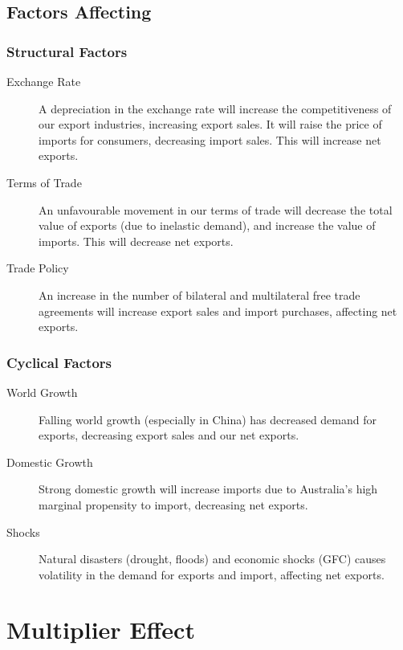 \documentclass[a4paper,11pt]{article}
\begin{document}
\subsection{Factors Affecting}

\subsubsection{Structural Factors}

\begin{description}
\item [Exchange Rate] A depreciation in the exchange rate will increase the
	competitiveness of our export industries, increasing export sales. It will
	raise the price of imports for consumers, decreasing import sales. This
	will increase net exports.
\item [Terms of Trade] An unfavourable movement in our terms of trade will
	decrease the total value of exports (due to inelastic demand), and increase
	the value of imports. This will decrease net exports.
\item [Trade Policy] An increase in the number of bilateral and multilateral
	free trade agreements will increase export sales and import purchases,
	affecting net exports.
\end{description}


\subsubsection{Cyclical Factors}

\begin{description}
\item [World Growth] Falling world growth (especially in China) has decreased
	demand for exports, decreasing export sales and our net exports.
\item [Domestic Growth] Strong domestic growth will increase imports due to
	Australia's high marginal propensity to import, decreasing net exports.
\item [Shocks] Natural disasters (drought, floods) and economic shocks (GFC)
	causes volatility in the demand for exports and import, affecting net
	exports.
\end{description}




\section{Multiplier Effect}
\end{document}
